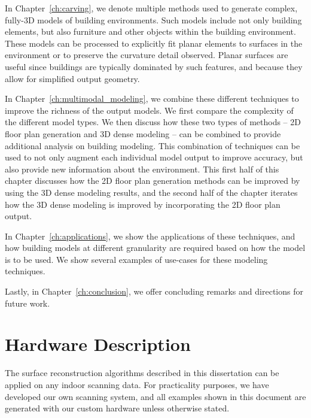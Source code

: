 \documentclass[12pt,onecolumn,oneside]{book}
\begin{document}
In Chapter~\ref{ch:carving}, we denote multiple methods used to generate complex, fully-3D models of building environments.  Such models include not only building elements, but also furniture and other objects within the building environment.  These models can be processed to explicitly fit planar elements to surfaces in the environment or to preserve the curvature detail observed.  Planar surfaces are useful since buildings are typically dominated by such features, and because they allow for simplified output geometry.

In Chapter~\ref{ch:multimodal_modeling}, we combine these different techniques to improve the richness of the output models. We first compare the complexity of the different model types.  We then discuss how these two types of methods -- 2D floor plan generation and 3D dense modeling -- can be combined to provide additional analysis on building modeling.  This combination of techniques can be used to not only augment each individual model output to improve accuracy, but also provide new information about the environment.  This first half of this chapter discusses how the 2D floor plan generation methods can be improved by using the 3D dense modeling results, and the second half of the chapter iterates how the 3D dense modeling is improved by incorporating the 2D floor plan output.

In Chapter~\ref{ch:applications}, we show the applications of these techniques, and how building models at different granularity are required based on how the model is to be used.  We show several examples of use-cases for these modeling techniques.

Lastly, in Chapter~\ref{ch:conclusion}, we offer concluding remarks and directions for future work.


\chapter{Hardware Description}
\label{ch:hardware}

The surface reconstruction algorithms described in this dissertation can be applied on any indoor scanning data.  For practicality purposes, we have developed our own scanning system, and all examples shown in this document are generated with our custom hardware unless otherwise stated.
\end{document}
